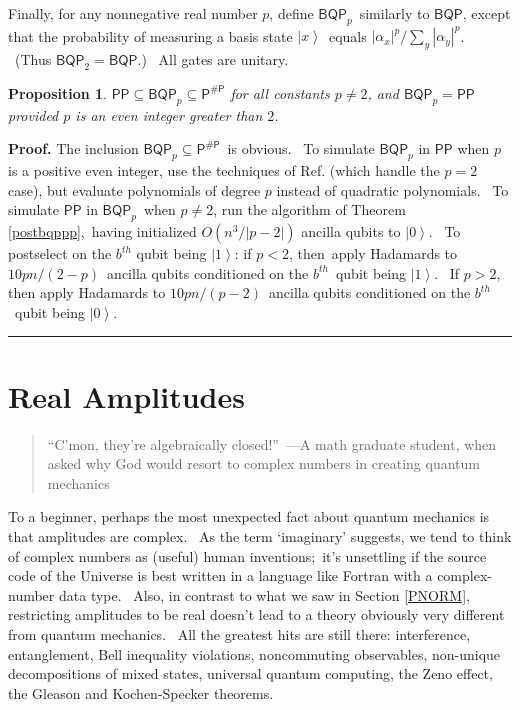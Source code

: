 \documentclass[12pt]{article}%
\newtheorem{proposition}[theorem]{Proposition}
\newenvironment{proof}[1][Proof]{\noindent\textbf{#1.} }{\ \rule{0.5em}{0.5em}}
\begin{document}
Finally, for any nonnegative real number $p$, define $\mathsf{BQP}_{p}%
$\ similarly to $\mathsf{BQP}$, except that the probability of measuring a
basis state $\left\vert x\right\rangle $\ equals $\left\vert \alpha
_{x}\right\vert ^{p}/\sum_{y}\left\vert \alpha_{y}\right\vert ^{p}$. \ (Thus
$\mathsf{BQP}_{2}=\mathsf{BQP}$.) \ All gates are unitary.

\begin{proposition}
\label{bqpp}$\mathsf{PP}\subseteq\mathsf{BQP}_{p}\subseteq\mathsf{P}%
^{\mathsf{\#P}}$ for all constants $p\neq2$, and $\mathsf{BQP}_{p}%
=\mathsf{PP}$ provided $p$ is an even integer greater than $2$.
\end{proposition}

\begin{proof}
The inclusion $\mathsf{BQP}_{p}\subseteq\mathsf{P}^{\mathsf{\#P}}$\ is
obvious. \ To simulate $\mathsf{BQP}_{p}$ in $\mathsf{PP}$ when $p$ is a
positive even integer, use the techniques of Ref. \cite{adh} (which handle the
$p=2$ case), but evaluate polynomials of degree $p$ instead of quadratic
polynomials. \ To simulate $\mathsf{PP}$ in $\mathsf{BQP}_{p}$\ when $p\neq2$,
run the algorithm of Theorem \ref{postbqppp},\ having initialized $O\left(
n^{3}/\left\vert p-2\right\vert \right)  $ ancilla qubits to $\left\vert
0\right\rangle $. \ To postselect on the $b^{th}$ qubit being $\left\vert
1\right\rangle $: if $p<2$, then\ apply Hadamards to $10pn/\left(  2-p\right)
$\ ancilla qubits conditioned on the $b^{th}$\ qubit being $\left\vert
1\right\rangle $. \ If $p>2$, then apply Hadamards to $10pn/\left(
p-2\right)  $\ ancilla qubits conditioned on the $b^{th}$\ qubit being
$\left\vert 0\right\rangle $. \ 
\end{proof}

\section{Real Amplitudes\label{REAL}}

\begin{quote}
\textquotedblleft C'mon, they're algebraically closed!\textquotedblright\ ---A
math graduate student, when asked why God would resort to complex numbers in
creating quantum mechanics
\end{quote}

To a beginner, perhaps the most unexpected fact about quantum mechanics is
that amplitudes are complex. \ As the term `imaginary' suggests, we tend to
think of complex numbers as (useful) human inventions;\ it's unsettling if the
source code of the Universe is best written in a language like Fortran with a
complex-number data type. \ Also, in contrast to what we saw in Section
\ref{PNORM}, restricting amplitudes to be real doesn't lead to a theory
obviously very different from quantum mechanics. \ All the greatest hits are
still there: interference, entanglement, Bell inequality violations,
noncommuting observables, non-unique decompositions of mixed states, universal
quantum computing, the Zeno effect, the Gleason and Kochen-Specker theorems.
\end{document}
